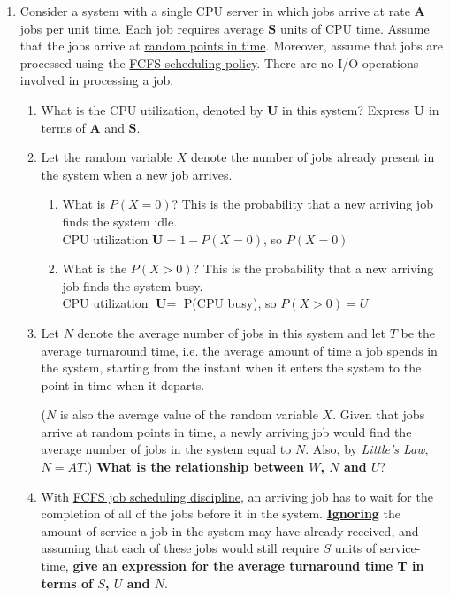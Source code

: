 \documentclass[11pt]{article}
\newcommand{\n}{\vspace{0.5cm}}
\begin{document}
\begin{enumerate}
  \item Consider a system with a single CPU server in which jobs arrive at rate \(\textbf{A}\) jobs per unit time.  Each job requires average \(\textbf{S}\) units of CPU time.  Assume that the jobs arrive at \ul{random points in time}.  Moreover, assume that jobs are processed using the \ul{FCFS scheduling policy}.  There are no I/O operations involved in processing a job.
    \begin{enumerate}
      \item What is the CPU utilization, denoted by \(\textbf{U}\) in this system?  Express \(\textbf{U}\) in terms of \(\textbf{A}\) and \(\textbf{S}\). \n\\


      \item Let the random variable \(X\) denote the number of jobs already present in the system when a new job arrives.
        \begin{enumerate}
          \item What is \(P(X=0)\)? This is the probability that a new arriving job finds the system idle. \n\\
            CPU utilization \(\textbf{U} = 1 - P(X=0)\), so \(P(X=0) \)\n

          \item What is the \(P(X>0)\)?  This is the probability that a new arriving job finds the system busy. \n\\
            CPU utilization \(\textbf{U} =\) P(CPU busy), so \(P(X>0) = U\)\n
        \end{enumerate}

      \item Let \(N\) denote the average number of jobs in this system and let \(T\) be the average turnaround time, i.e. the average amount of time a job spends in the system, starting from the instant when it enters the system to the point in time when it departs.  

        (\(N\) is also the average value of the random variable \(X\).  Given that jobs arrive at random points in time, a newly arriving job would find the average number of jobs in the system equal to \(N\). Also, by \textit{Little's Law}, \(N = AT\).)  \textbf{What is the relationship between \(W\), \(N\) and \(U\)}?

      \item With \ul{FCFS job scheduling discipline}, an arriving job has to wait for the completion of all of the jobs before it in the system.  \textbf{\ul{Ignoring}} the amount of service a job in the system may have already received, and assuming that each of these jobs would still require \(S\) units of service-time, \textbf{give an expression for the average turnaround time T in terms of \(S\), \(U\) and \(N\)}.


\end{enumerate}
\end{enumerate}
\end{document}
